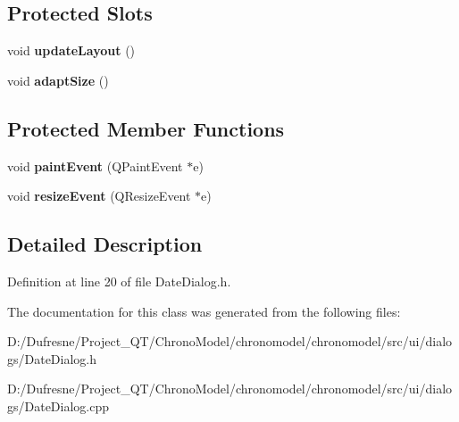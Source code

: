 \subsection*{Protected Slots}
\begin{DoxyCompactItemize}
\item 
\hypertarget{class_date_dialog_a7c7d290e4289e45342e8e760bcf3dc51}{void {\bfseries update\-Layout} ()}\label{class_date_dialog_a7c7d290e4289e45342e8e760bcf3dc51}

\item 
\hypertarget{class_date_dialog_a8bf8f13644d7fd3a49f49c4a5aa96897}{void {\bfseries adapt\-Size} ()}\label{class_date_dialog_a8bf8f13644d7fd3a49f49c4a5aa96897}

\end{DoxyCompactItemize}
\subsection*{Protected Member Functions}
\begin{DoxyCompactItemize}
\item 
\hypertarget{class_date_dialog_acebea23994482607ae6cb4347df81b38}{void {\bfseries paint\-Event} (Q\-Paint\-Event $\ast$e)}\label{class_date_dialog_acebea23994482607ae6cb4347df81b38}

\item 
\hypertarget{class_date_dialog_a4a6987034d2dae0da1f5c7da29ee6810}{void {\bfseries resize\-Event} (Q\-Resize\-Event $\ast$e)}\label{class_date_dialog_a4a6987034d2dae0da1f5c7da29ee6810}

\end{DoxyCompactItemize}


\subsection{Detailed Description}


Definition at line 20 of file Date\-Dialog.\-h.



The documentation for this class was generated from the following files\-:\begin{DoxyCompactItemize}
\item 
D\-:/\-Dufresne/\-Project\-\_\-\-Q\-T/\-Chrono\-Model/chronomodel/chronomodel/src/ui/dialogs/Date\-Dialog.\-h\item 
D\-:/\-Dufresne/\-Project\-\_\-\-Q\-T/\-Chrono\-Model/chronomodel/chronomodel/src/ui/dialogs/Date\-Dialog.\-cpp\end{DoxyCompactItemize}
